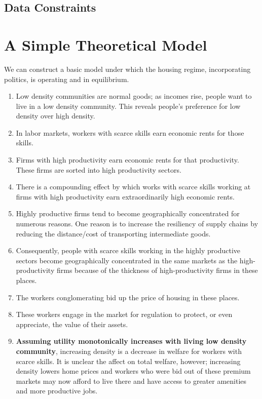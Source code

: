 \documentclass{article}
\begin{document}
\subsection{Data Constraints}

\section{A Simple Theoretical Model}
We can construct a basic model under which the housing regime, incorporating politics, is operating and in equilibrium.
\begin{enumerate}
	\item Low density communities are normal goods; as incomes rise, people want to live in a low density community. This reveals people's preference for low density over high density.
	\item In labor markets, workers with scarce skills earn economic rents for those skills.
	\item Firms with high productivity earn economic rents for that productivity. These firms are sorted into high productivity sectors.
	\item There is a compounding effect by which works with scarce skills working at firms with high productivity earn extraordinarily high economic rents.
	\item Highly productive firms tend to become geographically concentrated for numerous reasons. 
		\subitem One reason is to increase the resiliency of supply chains by reducing the distance/cost of transporting intermediate goods. 
	\item Consequently, people with scarce skills working in the highly productive sectors become geographically concentrated in the same markets as the high-productivity firms because of the thickness of high-productivity firms in these places.
	\item The workers conglomerating bid up the price of housing in these places.
	\item These workers engage in the market for regulation to protect, or even appreciate, the value of their assets.
	\item \textbf{Assuming utility monotonically increases with living low density community}, increasing density is a decrease in welfare for workers with scarce skills. 
		\subitem It is unclear the affect on total welfare, however; increasing density lowers home prices and workers who were bid out of these premium markets may now afford to live there and have access to greater amenities and more productive jobs.
\end{enumerate}
\end{document}
